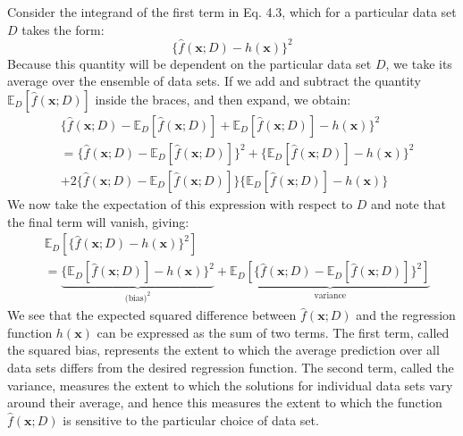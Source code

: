 \documentclass[twoside]{article}
\begin{document}
Consider the integrand of the first term in Eq. 4.3, which for a particular data set $D$ takes the form:
\begin{equation*}
    \{\hat{f}(\boldsymbol{x}; D) - h(\boldsymbol{x})\}^2
\end{equation*}
Because this quantity will be dependent on the particular data set $D$, we take its average over the ensemble of data sets. If we add and subtract the quantity $\mathbb{E}_D[\hat{f}(\boldsymbol{x}; D)]$ inside the braces, and then expand, we obtain:
\begin{equation*}
\begin{aligned}
    &\{\hat{f}(\boldsymbol{x}; D) - \mathbb{E}_D[\hat{f}(\boldsymbol{x}; D)] + \mathbb{E}_D[\hat{f}(\boldsymbol{x}; D)] - h(\boldsymbol{x})\}^2\\
    &= \{\hat{f}(\boldsymbol{x}; D) - \mathbb{E}_D[\hat{f}(\boldsymbol{x}; D)]\}^2 + \{\mathbb{E}_D[\hat{f}(\boldsymbol{x}; D)] - h(\boldsymbol{x})\}^2 \\
    &+ 2\{\hat{f}(\boldsymbol{x}; D) - \mathbb{E}_D[\hat{f}(\boldsymbol{x}; D)]\}\{\mathbb{E}_D[\hat{f}(\boldsymbol{x}; D)] - h(\boldsymbol{x})\}
\end{aligned}
\end{equation*}
We now take the expectation of this expression with respect to $D$ and note that the final term will vanish, giving:
\begin{equation*}
\begin{aligned}
    &\mathbb{E}_D[\{\hat{f}(\boldsymbol{x}; D) - h(\boldsymbol{x})\}^2] \\
    &= \underbrace{\{\mathbb{E}_D[\hat{f}(\boldsymbol{x}; D)] - h(\boldsymbol{x})\}^2}_{\text{(bias)}^2}  + \underbrace{\mathbb{E}_D[\{\hat{f}(\boldsymbol{x}; D) - \mathbb{E}_D[\hat{f}(\boldsymbol{x}; D)]\}^2]}_\text{variance}
\end{aligned}
\end{equation*}
We see that the expected squared difference between $\hat{f}(\boldsymbol{x}; D)$ and the regression function $h(\boldsymbol{x})$ can be expressed as the sum of two terms. The first term, called the squared bias, represents the extent to which the average prediction over all data sets differs from the desired regression function. The second term, called the variance, measures the extent to which the solutions for individual data sets vary around their average, and hence this measures the extent to which the function $\hat{f}(\boldsymbol{x}; D)$ is sensitive to the particular choice of data set.\\
\end{document}
